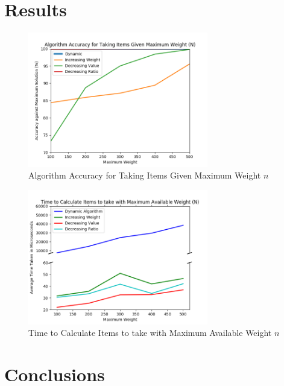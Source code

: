 \documentclass[10pt, letterpaper]{article}
\begin{document}
\section{Results}
	\begin{figure}[htbp]
		\begin{center}
			\includegraphics[width=0.70\textwidth]{python/accuracyGraph.png}
			\caption{Algorithm Accuracy for Taking Items Given Maximum Weight $n$}
			\label{fig:accuracy-graph}
		\end{center}
	\end{figure}
	\begin{figure}[htbp]
		\begin{center}
			\includegraphics[width=0.70\textwidth]{python/timeGraph.png}
			\caption{Time to Calculate Items to take with Maximum Available Weight $n$}
			\label{fig:time-graph}
		\end{center}
	\end{figure}

\section{Conclusions}
\end{document}
